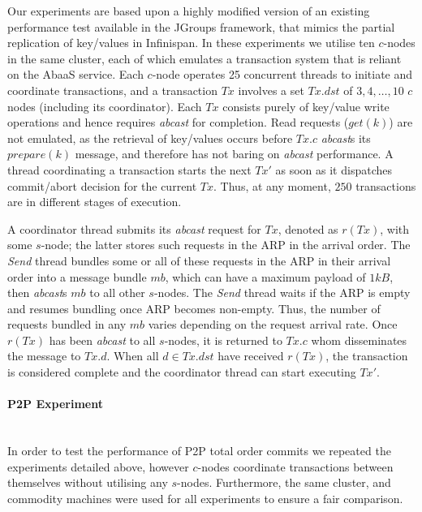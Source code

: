 Our experiments are based upon a highly modified version of an existing performance test available in the JGroups\citep{JGroups} framework, that mimics the partial replication of key/values in Infinispan\citep{Infinispan}.  In these experiments we utilise ten $c$-nodes in the same cluster, each of which emulates a transaction system that is reliant on the \textsf{AbaaS} service.  Each $c$-node operates 25 concurrent threads to initiate and coordinate transactions, and a transaction $Tx$ involves a set $Tx.dst$ of $3,4,\ldots,10$ $c$ nodes (including its coordinator). Each $Tx$ consists purely of key/value write operations and hence requires \emph{abcast} for completion. Read requests ($get(k)$) are not emulated, as the retrieval of key/values occurs before $Tx.c$ \emph{abcast}s its $prepare(k)$ message, and therefore has not baring on \emph{abcast} performance.  A thread coordinating a transaction starts the next $Tx'$ as soon as it dispatches commit/abort decision for the current $Tx$. Thus, at any moment, $250$ transactions are in different stages of execution.

A coordinator thread submits its \emph{abcast} request for $Tx$, denoted as $r(Tx)$, with some $s$-node; the latter stores such requests in the ARP in the arrival order. The \emph{Send} thread bundles some or all of these requests in the ARP in their arrival order into a message bundle $mb$, which can have a maximum payload of $1kB$, then \emph{abcast}s $mb$ to all other $s$-nodes.  The \emph{Send} thread waits if the ARP is empty and resumes bundling once ARP becomes non-empty. Thus, the number of requests bundled in any $mb$ varies depending on the request arrival rate. Once $r(Tx)$ has been \emph{abcast} to all $s$-nodes, it is returned to $Tx.c$ whom disseminates the message to $Tx.d$.  When all $d \in Tx.dst$ have received $r(Tx)$, the transaction is considered complete and the coordinator thread can start executing $Tx'$.  

\paragraph{P2P Experiment} \hspace{0pt} \\
In order to test the performance of P2P total order commits we repeated the  experiments detailed above, however $c$-nodes coordinate transactions between themselves without utilising any $s$-nodes.  Furthermore, the same cluster, and commodity machines were used for all experiments to ensure a fair comparison.   

